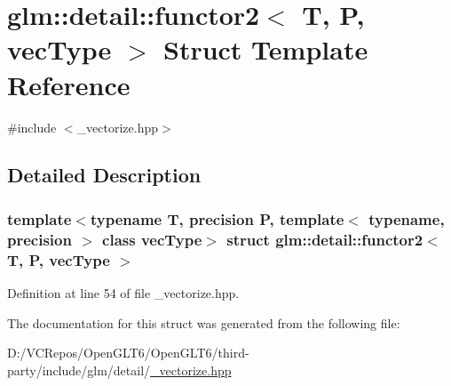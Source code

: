 \hypertarget{structglm_1_1detail_1_1functor2}{}\section{glm\+::detail\+::functor2$<$ T, P, vec\+Type $>$ Struct Template Reference}
\label{structglm_1_1detail_1_1functor2}


{\ttfamily \#include $<$\+\_\+vectorize.\+hpp$>$}



\subsection{Detailed Description}
\subsubsection*{template$<$typename T, precision P, template$<$ typename, precision $>$ class vec\+Type$>$\newline
struct glm\+::detail\+::functor2$<$ T, P, vec\+Type $>$}



Definition at line 54 of file \+\_\+vectorize.\+hpp.



The documentation for this struct was generated from the following file\+:\begin{DoxyCompactItemize}
\item 
D\+:/\+V\+C\+Repos/\+Open\+G\+L\+T6/\+Open\+G\+L\+T6/third-\/party/include/glm/detail/\mbox{\hyperlink{__vectorize_8hpp}{\+\_\+vectorize.\+hpp}}\end{DoxyCompactItemize}
